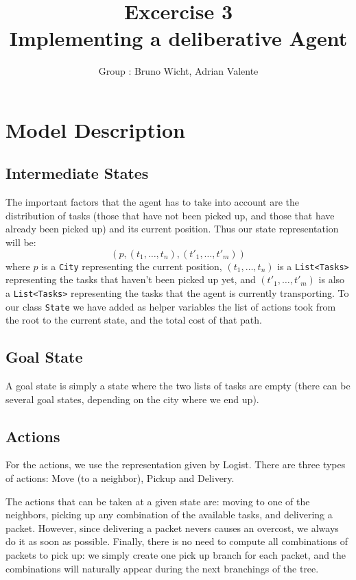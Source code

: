 \documentclass[11pt]{article}
\title{\bf Excercise 3\\ Implementing a deliberative Agent}
\author{Group \textnumero : Bruno Wicht, Adrian Valente}
\begin{document}
\maketitle

\section{Model Description}

\subsection{Intermediate States}
The important factors that the agent has to take into account are the distribution of tasks (those that have not been picked up, and those that have already been picked up) and its current position. Thus our state representation will be:
$$ (p, (t_1,\dots,t_n), (t'_1,\dots,t'_m)) $$
where $p$ is a \texttt{City} representing the current position, $(t_1,\dots,t_n)$ is a \texttt{List<Tasks>} representing the tasks that haven't been picked up yet, and $(t'_1,\dots,t'_m)$ is also a \texttt{List<Tasks>} representing the tasks that the agent is currently transporting. To our class \texttt{State} we have added as helper variables the list of actions took from the root to the current state, and the total cost of that path.

\subsection{Goal State}
A goal state is simply a state where the two lists of tasks are empty (there can be several goal states, depending on the city where we end up). 

\subsection{Actions}
For the actions, we use the representation given by Logist. There are three types of actions: Move (to a neighbor), Pickup and Delivery. 

The actions that can be taken at a given state are: moving to one of the neighbors, picking up any combination of the available tasks, and delivering a packet. However, since delivering a packet nevers causes an overcost, we always do it as soon as possible. Finally, there is no need to compute all combinations of packets to pick up: we simply create one pick up branch for each packet, and the combinations will naturally appear during the next branchings of the tree.
\end{document}
